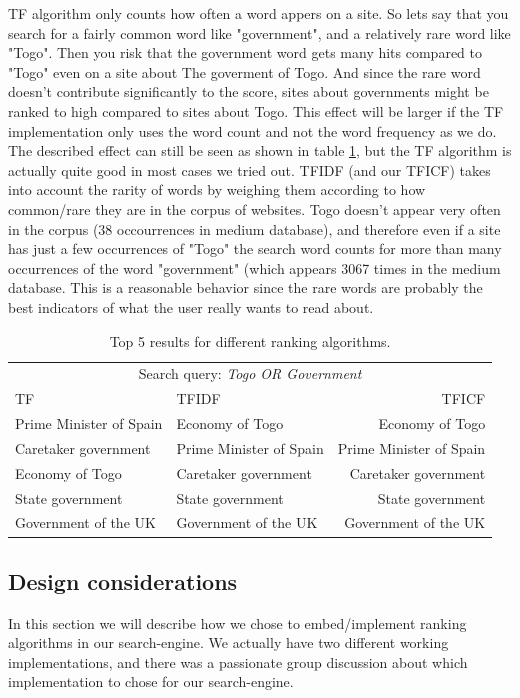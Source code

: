 TF algorithm only counts how often a word appers on a site. So lets say that you search for a fairly common word like "government", and a relatively rare word like "Togo". Then you risk that the government word gets many hits compared to "Togo" even on a site about The goverment of Togo. And since the rare word doesn't contribute significantly to the score, sites about governments might be ranked to high compared to sites about Togo. 
This effect will be larger if the TF implementation only uses the word count and not the word frequency as we do. The described effect can still be seen as shown in table \ref{tab:comparisonRankingAlgorithms}, but the TF algorithm is actually quite good in most cases we tried out.   
TFIDF (and our TFICF) takes into account the rarity of words by weighing them according to how common/rare they are in the corpus of websites. 
Togo doesn't appear very often in the corpus (38 occourrences in medium database), and therefore even if a site has just a few occurrences of "Togo" the search word counts for more than many occurrences of the word "government" (which appears 3067 times in the medium database.
This is a reasonable behavior since the rare words are probably the best indicators of what the user really wants to read about.  

\begin{table}[b]
	\centering
\begin{tabular}{@{}llr@{}} \toprule
	\multicolumn{3}{c}{Search query: \textit{Togo OR Government}} \\ \cmidrule(r){1-3}
	TF 									& TFIDF 							& TFICF \\ \midrule
	Prime Minister of Spain 			& Economy of Togo 					& Economy of Togo \\
	Caretaker government 				& Prime Minister of Spain 			& Prime Minister of Spain \\
	Economy of Togo		    			& Caretaker government 				& Caretaker government \\
	State government 					& State government					& State government \\
	Government of the UK 	& Government of the UK 	& Government of the UK \\ \bottomrule
\end{tabular}
\caption{Top 5 results for different ranking algorithms.}	
\label{tab:comparisonRankingAlgorithms}
\end{table}


\subsection{Design considerations}
In this section we will describe how we chose to embed/implement ranking algorithms in our search-engine. We actually have two different working implementations, and there was a passionate group discussion about which implementation to chose for our search-engine.  

